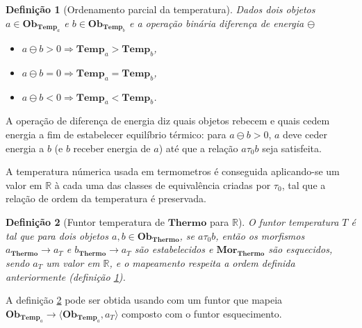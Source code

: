 \documentclass[a4paper]{article}
\newcommand{\trls}{{\tau_0}}
\newcommand{\trl}[2]{{#1 \trls #2}}
\newcommand{\termo}{{\mathbf{Thermo}}}
\newcommand{\obtermo}{{\mathbf{Ob}_\termo}}
\newcommand{\mortermo}{{\mathbf{Mor}_\termo}}
\newcommand{\tempn}[1]{{\mathbf{Temp}_{#1}}}
\newcommand{\obtempn}[1]{{\mathbf{Ob}_{\tempn{#1}}}}
\newcommand{\diffen}{{\ominus}}
\newtheorem{definicao}{Definição}[section]
\begin{document}
\begin{definicao}[Ordenamento parcial da temperatura] \label{def:ordemtemp}
Dados dois objetos $a \in \obtempn{a}$ e $b \in \obtempn{b}$ e a operação binária diferença de energia $\diffen$
\begin{itemize}
\item $a \diffen b > 0 \Rightarrow \tempn{a} > \tempn{b}$,
\item $a \diffen b = 0 \Rightarrow \tempn{a} = \tempn{b}$,
\item $a \diffen b < 0 \Rightarrow \tempn{a} < \tempn{b}$.
\end{itemize}
\end{definicao}

A operação de diferença de energia diz quais objetos rebecem e quais cedem energia a fim de estabelecer equilíbrio térmico: para $a \diffen b > 0$, $a$ deve ceder energia a $b$ (e $b$ receber energia de $a$) até que a relação $\trl{a}{b}$ seja satisfeita.

A temperatura númerica usada em termometros é conseguida aplicando-se um valor em $\mathbb{R}$ à cada uma das classes de equivalência criadas por $\trls$, tal que a relação de ordem da temperatura é preservada.

\begin{definicao}[Funtor temperatura de $\termo$ para $\mathbb{R}$] \label{def:funtemp}
O funtor temperatura $T$ é tal que para dois objetos $a,b \in \obtermo$, se $\trl{a}{b}$, então os morfismos $a_\termo \to a_T$ e $b_\termo \to a_T$ são estabelecidos e $\mortermo$ são esquecidos, sendo $a_T$ um valor em $\mathbb{R}$, e o mapeamento respeita a ordem definida anteriormente (definição \ref{def:ordemtemp}).
\end{definicao}

A definição \ref{def:funtemp} pode ser obtida usando com um funtor que mapeia $\obtempn{a} \to \langle\obtempn{a}, a_T\rangle$ composto com o funtor esquecimento.
\end{document}
